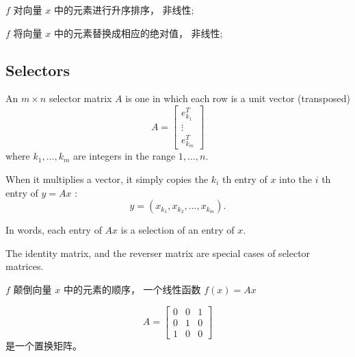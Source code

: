 \begin{example}
    $ f $ 对向量 $ x $ 中的元素进行升序排序， 非线性;
\end{example}

\begin{example}
    $ f $ 将向量 $ x $ 中的元素替换成相应的绝对值， 非线性;
\end{example}


\subsection{Selectors}



\begin{definition}
    An $ m \times n $ selector matrix $ A $ is one in which each row is a unit vector (transposed)
\begin{equation}
A=\left[\begin{array}{c}
e_{k_{1}}^{T} \\
\vdots \\
e_{k_{m}}^{T}
\end{array}\right]
\end{equation}
where $ k_{1}, \ldots, k_{m} $ are integers in the range $ 1, \ldots, n . $ 
\end{definition}

When it multiplies a vector, it simply copies the $ k_{i} $ th entry of $ x $ into the $ i $ th entry of $ y=A x $ :
\begin{equation}
y=\left(x_{k_{1}}, x_{k_{2}}, \ldots, x_{k_{m}}\right) .
\end{equation}

In words, each entry of $ A x $ is a selection of an entry of $ x $.

The identity matrix, and the reverser matrix are special cases of selector matrices.

\begin{definition}
    $ f $ 颠倒向量 $ x $ 中的元素的顺序， 一个线性函数 $ f(x)=A x $

    \begin{equation} A=\left[\begin{array}{lll}0 & 0 & 1 \\ 0 & 1 & 0 \\ 1 & 0 & 0\end{array}\right] \end{equation}是一个置换矩阵。
\end{definition}

